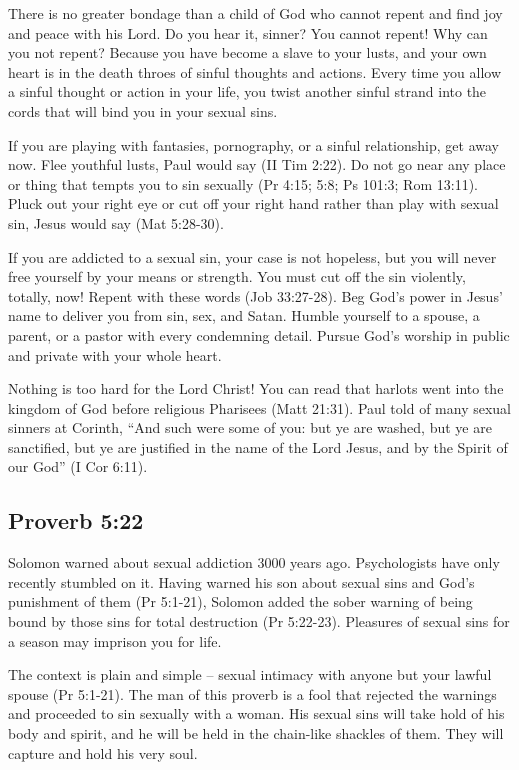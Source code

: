 There is no greater bondage than a child of God who cannot repent and find joy and peace with his Lord. Do you hear it, sinner? You cannot repent! Why can you not repent? Because you have become a slave to your lusts, and your own heart is in the death throes of sinful thoughts and actions. Every time you allow a sinful thought or action in your life, you twist another sinful strand into the cords that will bind you in your sexual sins.

If you are playing with fantasies, pornography, or a sinful relationship, get away now. Flee youthful lusts, Paul would say (II Tim 2:22). Do not go near any place or thing that tempts you to sin sexually (Pr 4:15; 5:8; Ps 101:3; Rom 13:11). Pluck out your right eye or cut off your right hand rather than play with sexual sin, Jesus would say (Mat 5:28-30).

If you are addicted to a sexual sin, your case is not hopeless, but you will never free yourself by your means or strength. You must cut off the sin violently, totally, now! Repent with these words (Job 33:27-28). Beg God’s power in Jesus’ name to deliver you from sin, sex, and Satan. Humble yourself to a spouse, a parent, or a pastor with every condemning detail. Pursue God’s worship in public and private with your whole heart.

Nothing is too hard for the Lord Christ! You can read that harlots went into the kingdom of God before religious Pharisees (Matt 21:31). Paul told of many sexual sinners at Corinth, “And such were some of you: but ye are washed, but ye are sanctified, but ye are justified in the name of the Lord Jesus, and by the Spirit of our God” (I Cor 6:11).

\subsection{Proverb 5:22}
Solomon warned about sexual addiction 3000 years ago. Psychologists have only recently stumbled on it. Having warned his son about sexual sins and God’s punishment of them (Pr 5:1-21), Solomon added the sober warning of being bound by those sins for total destruction (Pr 5:22-23). Pleasures of sexual sins for a season may imprison you for life.

The context is plain and simple – sexual intimacy with anyone but your lawful spouse (Pr 5:1-21). The man of this proverb is a fool that rejected the warnings and proceeded to sin sexually with a woman. His sexual sins will take hold of his body and spirit, and he will be held in the chain-like shackles of them. They will capture and hold his very soul.

